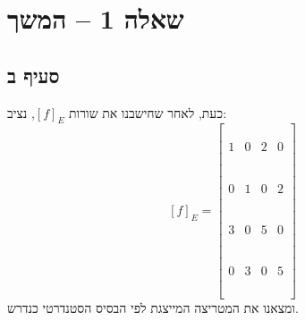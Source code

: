 \documentclass[11pt, oneside]{article}
\newcommand{\qed}{\R{$\blacksquare$}}
\newcommand{\br}{\\\\\\\\\\\\}
\begin{document}
\section*{שאלה 1 -- המשך}
\subsection*{סעיף ב}
כעת, לאחר שחישבנו את שורות $[f]_{E}$, נציב:
\[
[f]_{E} = \begin{bmatrix}\\\\\\
1 & 0 & 2 & 0\br
0 & 1 & 0 & 2\br
3 & 0 & 5 & 0\br
0 & 3 & 0 & 5\\\\\\\\
\end{bmatrix}
\]
ומצאנו את המטריצה המייצגת לפי הבסיס הסטנדרטי כנדרש.
\br\qed
\end{document}
